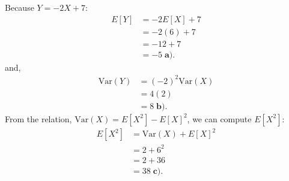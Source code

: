 \documentclass[a4paper, 10pt]{article}
\begin{document}
\begin{solution}
Because \( Y = -2X + 7 \):
\begin{align*}
    E[Y] &= -2E[X] + 7 \\
    &= -2(6) + 7 \\
    &= -12 + 7 \\
    &= \boxed{-5} \; \textbf{a).}
\end{align*}
and,
\begin{align*}
    \text{Var}(Y) &= (-2)^2 \text{Var}(X) \\
    &= 4(2) \\
    &= \boxed{8} \; \textbf{b).}
\end{align*}
From the relation, \( \text{Var}(X) = E[X^2] - E[X]^2 \), we can compute \( E[X^2] \):
\begin{align*}
    E[X^2] &= \text{Var}(X) + E[X]^2 \\
    &= 2 + 6^2 \\
    &= 2 + 36 \\
    &= \boxed{38} \; \textbf{c).}
\end{align*}
\end{solution}
\end{document}
